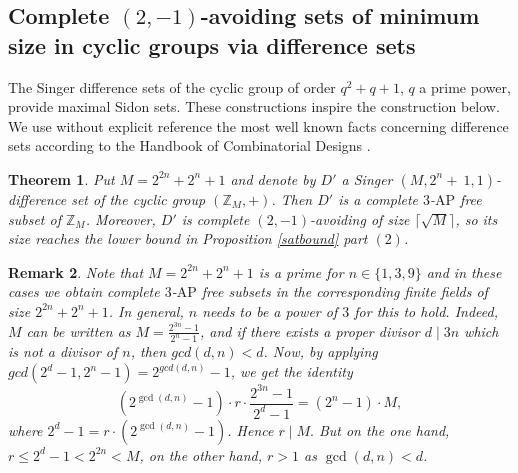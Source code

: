 \documentclass[11pt]{article}
\numberwithin{table}{section}
\newtheorem{theorem}{Theorem}[section]
\newtheorem{remark}[theorem]{Remark}
\newtheorem{constr}[theorem]{\bf Construction}
\theoremstyle{definition}
\begin{document}
	
	
	
	\subsection{\texorpdfstring{Complete $(2,-1)$-avoiding sets of minimum size in cyclic groups via difference sets}{Small complete (2,-1)-avoiding sets in cyclic groups via difference sets}}
	
	
	The Singer difference sets of the cyclic group of order $q^2+q+1$, $q$ a prime power, provide maximal Sidon sets. These constructions inspire the construction below. We use without explicit reference the most well known facts concerning difference sets according to the Handbook of Combinatorial Designs \cite{handbook}.
	
	\begin{theorem}\label{diffset} 
		Put $M=2^{2n}+2^n+1$ and denote by $D'$ a Singer  $(M,2^n+~1,1)$-difference set of the cyclic group $(\mathbb{Z}_M,+)$. 
		Then $D'$ is a complete $3$-$\mathrm{AP}$ free subset of $\mathbb{Z}_M$. Moreover, $D'$ is complete $(2,-1)$-avoiding of size $\lceil \sqrt{M}\rceil$, so its size reaches the lower bound in Proposition \ref{satbound} part $(2)$. 
	\end{theorem}
	
	\begin{remark}
		Note that $M=2^{2n}+2^n+1$ is a prime for $n\in \{1,3,9\}$ and in these cases we obtain  complete $3$-$\mathrm{AP}$ free subsets in the corresponding finite fields of size $2^{2n}+2^n+1$. In general, $n$ needs to be a power of $3$ for this to hold.  Indeed, $M$ can be written as $M= \frac{2^{3n}-1}{2^n-1}$, and if there exists a proper divisor $d\mid 3n$ which is not a divisor of $n$, then $gcd(d,n)<d$. Now, by applying $gcd(2^d-1,2^n-1)=2^{gcd(d,n)}-1$, we get the identity \begin{equation}
			(2^{\gcd(d,n)}-1)\cdot r\cdot \frac{2^{3n}-1}{2^d-1}=(2^n-1)\cdot M,   
		\end{equation} where
		$2^d-1=r\cdot (2^{\gcd(d,n)}-1)$. Hence $r\mid M.$ But on the one hand,\\ $r\leq 2^d-1<2^{2n}<M$, on the other hand, $r>1$ as $\gcd(d,n)<d$.
	\end{remark}
	
\end{document}
